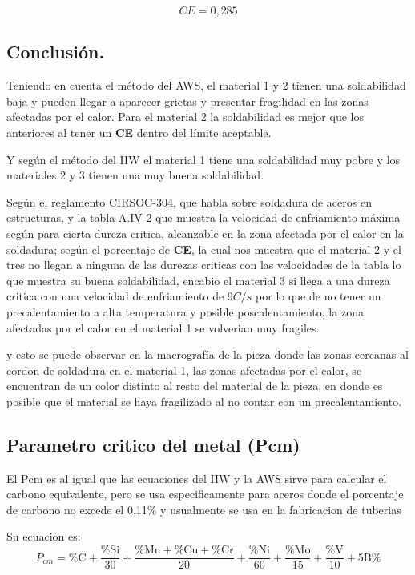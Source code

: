 \documentclass[12pt,a4paper]{article}
\begin{document}
\begin{equation*}
    CE = 0,285
\end{equation*}

\subsection{Conclusión.}

Teniendo en cuenta el método del AWS, el material 1 y 2 tienen una soldabilidad baja y pueden llegar a aparecer grietas y presentar fragilidad en las zonas afectadas por el calor. Para el material 2 la soldabilidad es mejor que los anteriores al tener un \textbf{CE} dentro del límite aceptable.

Y según el método del IIW el material 1 tiene una soldabilidad muy pobre y los materiales 2 y 3 tienen una muy buena soldabilidad.

Según el reglamento CIRSOC-304, que habla sobre soldadura de aceros en estructuras, y la tabla A.IV-2 que muestra la velocidad de enfriamiento máxima según para cierta dureza critica, alcanzable en la zona afectada por el calor en la soldadura; según el porcentaje de \textbf{CE}, la cual nos muestra que el material 2 y el tres no llegan a ninguna de las durezas criticas con las velocidades de la tabla lo que muestra su buena soldabilidad, encabio el material 3 si llega a una dureza critica con una velocidad de enfriamiento de 9$C/s$ por lo que de no tener un precalentamiento a alta temperatura y posible poscalentamiento, la zona afectadas por el calor en el material 1 se volverian muy fragiles.

y esto se puede observar en la macrografía de la pieza donde las zonas cercanas al cordon de soldadura en el material 1, las zonas afectadas por el calor, se encuentran de un color distinto al resto del material de la pieza, en donde es posible que el material se haya fragilizado al no contar con un precalentamiento.

\subsection{Parametro critico del metal (Pcm)}
El Pcm es al igual que las ecuaciones del IIW y la AWS sirve para calcular el carbono equivalente, pero se usa especificamente para aceros donde el porcentaje de carbono no excede el 0,11\% y usualmente se usa en la fabricacion de tuberias

Su ecuacion es:
\begin{equation}
    P_{cm} = \text{\%C} + \frac{\text{\%Si}}{30} + \frac{\text{\%Mn}+\text{\%Cu}+\text{\%Cr}}{20} + \frac{\text{\%Ni}}{60} + \frac{\text{\%Mo}}{15} + \frac{\text{\%V}}{10} + \text{5B\%}
\end{equation}
\end{document}
